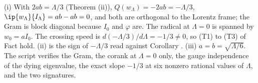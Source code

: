 (i) With $2ab = \Lambda/3$ (Theorem (ii)), $Q(w_{\Lambda}) = -2ab = -\Lambda/3$, $\ip{w_{\Lambda}}{I_{\Lambda}} = ab - ab = 0$, and both are orthogonal to the Lorentz frame; the Gram is block diagonal because $I_{0}$ and $\varphi$ are. The radical at $\Lambda = 0$ is spanned by $w_{0} = aI_{0}$. The crossing speed is $d(-\Lambda/3)/d\Lambda = -1/3 \neq 0$, so (T1) to (T3) of Fact  hold. (ii) is the sign of $-\Lambda/3$ read against Corollary . (iii) $a = b = \sqrt{\Lambda/6}$. The script verifies the Gram, the corank at $\Lambda = 0$ only, the gauge independence of the dying eigenvalue, the exact slope $-1/3$ at six nonzero rational values of $\Lambda$, and the two signatures.
